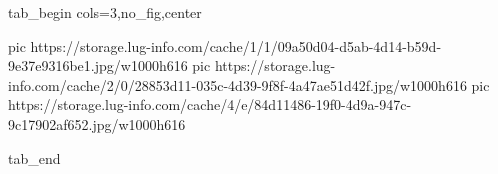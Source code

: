  
 
 
 
 


\ifcmt
  tab_begin cols=3,no_fig,center

     pic https://storage.lug-info.com/cache/1/1/09a50d04-d5ab-4d14-b59d-9e37e9316be1.jpg/w1000h616%
		 pic https://storage.lug-info.com/cache/2/0/28853d11-035c-4d39-9f8f-4a47ae51d42f.jpg/w1000h616%
		 pic https://storage.lug-info.com/cache/4/e/84d11486-19f0-4d9a-947c-9c17902af652.jpg/w1000h616%

  tab_end
\fi
